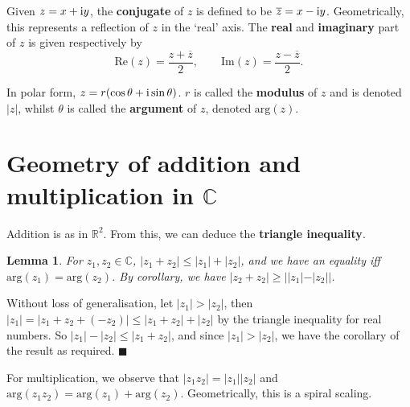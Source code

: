 \documentclass[letter-paper]{tufte-book}
\newtheorem{lemma}[theorem]{\color{pastel-blue}Lemma}
\newenvironment{proof}[1][Proof]{\begin{trivlist}
\item[\hskip \labelsep {\bfseries #1}]}{\end{trivlist}}
\newcommand{\zi}{{\rm i}}
\newcommand\Real{\mbox{Re}} %
\newcommand\Imag{\mbox{Im}} %
\newcommand{\zbar}{{\overline{z}}}
\newcommand\Def[1]{\textbf{#1}}
\newcommand{\qed}{\hfill$\blacksquare$}
\begin{document}
Given $z=x+\zi y$, the \Def{conjugate} of $z$ is defined to be
$\zbar=x-\zi y$. Geometrically, this represents a reflection of $z$ in the
`real' axis. The \Def{real} and \Def{imaginary} part of $z$ is
given respectively by
\begin{equation*}
	\Real(z)=\frac{z+\zbar}{2},\qquad \Imag(z)=\frac{z-\zbar}{2}.
\end{equation*}

In polar form, $z=r(\cos\theta+\zi\sin\theta)$. $r$ is called the
\Def{modulus} of $z$ and is denoted $|z|$, whilst $\theta$ is called the
\Def{argument} of $z$, denoted $\mbox{arg}(z)$.


\section{Geometry of addition and multiplication in $\mathbb{C}$}

Addition is as in $\mathbb{R}^2$. From this, we can deduce the \Def{triangle
inequality}.
\begin{lemma}
	For $z_1,z_2\in\mathbb{C}$, $|z_1 +z_2|\leq|z_1|+|z_2|$, and we have an
	equality iff $\mbox{arg}(z_1)=\mbox{arg}(z_2)$. By corollary, we have $|z_2
	+z_2|\geq||z_1|-|z_2||$.
\end{lemma}
\begin{proof}
	Without loss of generalisation, let $|z_1|>|z_2|$, then $|z_1|=|z_1 + z_2 +
	(-z_2)|\leq|z_1+z_2|+|z_2|$ by the triangle inequality for real numbers. So
	$|z_1|-|z_2|\leq|z_1+z_2|$, and since $|z_1|>|z_2|$, we have the corollary
	of the result as required. \qed
\end{proof}

For multiplication, we observe that $|z_1 z_2|=|z_1||z_2|$ and $\mbox{arg}(z_1
z_2)=\mbox{arg}(z_1)+\mbox{arg}(z_2)$. Geometrically, this is a spiral scaling.
\end{document}
